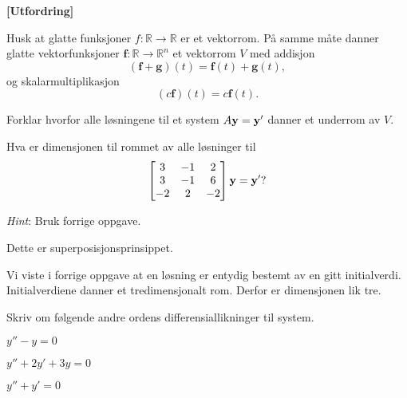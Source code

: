 \newpage
\begin{oppgave}\textbf{[Utfordring]}
	
\noindent
Husk at glatte funksjoner $f :\mathbb{R}\rightarrow \mathbb{R}$ er et vektorrom. På samme måte danner glatte vektorfunksjoner $\mathbf f:\mathbb{R}\rightarrow \mathbb{R}^n$ et vektorrom $V$ med addisjon
$$(\mathbf f + \mathbf g)(t)=\mathbf{f}(t)+\mathbf{g}(t),$$ og skalarmultiplikasjon
$$(c \mathbf f )(t)=c\mathbf{f}(t).$$

\begin{punkt}
Forklar hvorfor alle løsningene til et system $A\mathbf{y}=\mathbf{y}'$ danner et underrom av $V$.
\end{punkt}

\begin{punkt}
Hva er dimensjonen til rommet av alle løsninger til $$
\begin{bmatrix}
3 & -1 & 2\\
3 & -1 & 6\\
-2 & 2 & -2
\end{bmatrix} \mathbf{y}= \mathbf{y} ' ?$$

\noindent
\emph{Hint}: Bruk forrige oppgave.
\end{punkt}


\end{oppgave}





\begin{losning}
	\begin{punkt}
		Dette er superposisjonsprinsippet.
	\end{punkt}
	
	\begin{punkt}
	Vi viste i forrige oppgave at en løsning er entydig bestemt av en gitt initialverdi. Initialverdiene danner et tredimensjonalt rom. Derfor er dimensjonen lik tre.
	\end{punkt}
	
	
\end{losning}











\begin{oppgave}
Skriv om følgende andre ordens differensiallikninger til system.

\begin{punkt}
$y''-y=0$
\end{punkt}

\begin{punkt}
	$y''+2y'+3y=0$
\end{punkt}

\begin{punkt}
	$y''+y'=0$
\end{punkt}


\end{oppgave}

